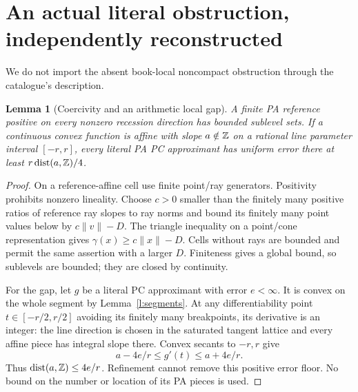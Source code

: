 \documentclass[11pt]{article}
\newtheorem{lemma}[theorem]{Lemma}
\begin{document}
\section{An actual literal obstruction, independently reconstructed}\label{s:literal}
We do not import the absent book-local noncompact obstruction through the catalogue's description.

\begin{lemma}[Coercivity and an arithmetic local gap]\label{l:literaltools}
A finite PA reference positive on every nonzero recession direction has bounded sublevel sets. If a continuous convex function is affine with slope $a\notin\mathbb Z$ on a rational line parameter interval $[-r,r]$, every literal PA PC approximant has uniform error there at least $r\operatorname{dist}(a,\mathbb Z)/4$.
\end{lemma}
\begin{proof}
On a reference-affine cell use finite point/ray generators. Positivity prohibits nonzero lineality. Choose $c>0$ smaller than the finitely many positive ratios of reference ray slopes to ray norms and bound its finitely many point values below by $c\|v\|-D$. The triangle inequality on a point/cone representation gives $\gamma(x)\geq c\|x\|-D$. Cells without rays are bounded and permit the same assertion with a larger $D$. Finiteness gives a global bound, so sublevels are bounded; they are closed by continuity.

For the gap, let $g$ be a literal PC approximant with error $e<\infty$. It is convex on the whole segment by Lemma~\ref{l:segments}. At any differentiability point $t\in[-r/2,r/2]$ avoiding its finitely many breakpoints, its derivative is an integer: the line direction is chosen in the saturated tangent lattice and every affine piece has integral slope there. Convex secants to $-r,r$ give
\[
 a-4e/r\leq g'(t)\leq a+4e/r.
\]
Thus $\operatorname{dist}(a,\mathbb Z)\leq4e/r$. Refinement cannot remove this positive error floor. No bound on the number or location of its PA pieces is used.
\end{proof}
\end{document}
